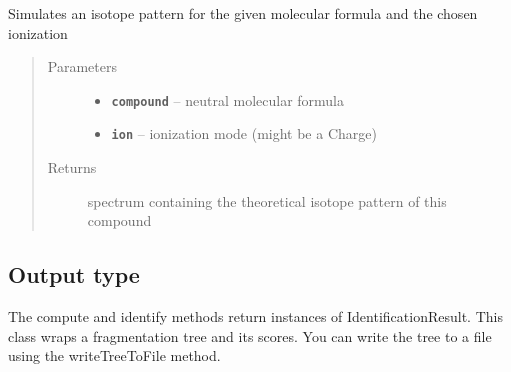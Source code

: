\documentclass[letterpaper,10pt,openany,oneside]{sphinxmanual}
\begin{document}
\begin{fulllineitems}
\label{library:de.unijena.bioinf.sirius.simulateIsotopePattern(MolecularFormula, Ionization)}
Simulates an isotope pattern for the given molecular formula and the chosen ionization
\begin{quote}\begin{description}
\item[{Parameters}] \leavevmode\begin{itemize}
\item {} 
\textbf{\texttt{compound}} -- neutral molecular formula

\item {} 
\textbf{\texttt{ion}} -- ionization mode (might be a Charge)

\end{itemize}

\item[{Returns}] \leavevmode
spectrum containing the theoretical isotope pattern of this compound

\end{description}\end{quote}

\end{fulllineitems}



\subsection{Output type}
\label{library:output-type}

\begin{fulllineitems}
\label{library:de.unijena.bioinf.sirius.IdentificationResult}
The compute and identify methods return instances of
IdentificationResult. This class wraps a fragmentation tree and its scores. You can write the tree to a file using the writeTreeToFile method.

\end{fulllineitems}

\end{document}
